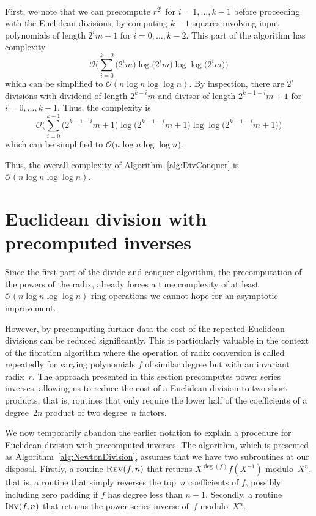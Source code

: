 First, we note that we can precompute $r^{2^i}$ for $i = 1, \dotsc, k-1$ 
before proceeding with the Euclidean divisions, by computing $k-1$ squares 
involving input polynomials of length $2^{i} m + 1$ for 
$i = 0, \dotsc, k-2$.  This part of the algorithm has complexity 
\begin{equation*}
\mathcal{O} \biggl( \sum_{i=0}^{k-2} \bigl(2^{i} m\bigr) 
    \log \bigl(2^{i} m\bigr) \log \log \bigl(2^{i} m\bigr) \biggr)
\end{equation*}
which can be simplified to $\mathcal{O}(n \log n \log \log n)$.
By inspection, there are $2^i$ divisions with dividend of length 
$2^{k-i} m$ and divisor of length $2^{k-1-i} m + 1$
for $i = 0, \dotsc, k-1$.  Thus, the complexity is 
\begin{equation*}
\mathcal{O} \biggl( \sum_{i=0}^{k-1} \bigl(2^{k-1-i} m + 1\bigr) 
    \log \bigl(2^{k-1-i} m + 1\bigr) 
    \log \log \bigl(2^{k-1-i} m + 1\bigr) \biggr)
\end{equation*}
which can be simplified to $\mathcal{O} \bigl( n \log n \log \log n \bigr)$.

Thus, the overall complexity of Algorithm~\ref{alg:DivConquer} is 
$\mathcal{O}(n \log n \log \log n)$.


\section{Euclidean division with precomputed inverses}

Since the first part of the divide and conquer algorithm, the 
precomputation of the powers of the radix, already forces a 
time complexity of at least $\mathcal{O} (n \log n \log \log n)$ 
ring operations we cannot hope for an asymptotic improvement.

However, by precomputing further data the cost of the repeated 
Euclidean divisions can be reduced significantly.  This is 
particularly valuable in the context of the fibration algorithm 
where the operation of radix conversion is called repeatedly 
for varying polynomials $f$ of similar degree but with an invariant 
radix~$r$.  The approach presented in this section precomputes 
power series inverses, allowing us to reduce the cost of a 
Euclidean division to two short products, that is, routines
that only require the lower half of the coefficients of a degree~$2n$ 
product of two degree~$n$ factors.

We now temporarily abandon the earlier notation to explain 
a procedure for Euclidean division with precomputed inverses. 
The algorithm, which is presented as Algorithm~\ref{alg:NewtonDivision}, 
assumes that we have two subroutines at our disposal.  Firstly, 
a routine $\Call{Rev}{f,n}$ that returns $X^{\deg(f)} f(X^{-1})$ 
modulo~$X^n$, that is, a routine that simply reverses the top~$n$ 
coefficients of $f$, possibly including zero padding if $f$ has degree 
less than $n - 1$.  Secondly, a routine $\Call{Inv}{f,n}$ that returns 
the power series inverse of~$f$ modulo~$X^n$.

